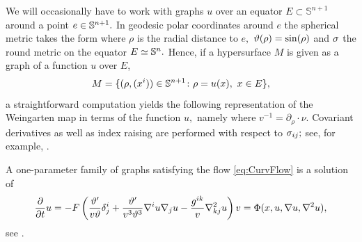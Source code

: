 \documentclass{amsart}
\begin{document}
We will occasionally have to work with graphs \(u\) over an equator $E \subset \mathbb{S}^{n+1}$ around a point $e\in\S^{n+1}.$ In geodesic polar coordinates around $e$ the spherical metric takes the form
where $\rho$ is the radial distance to $e,$ $\vt(\rho)=\sin(\rho)$ and $\s$ the round metric on the equator $E\simeq \S^n.$ Hence, if a hypersurface $M$ is given as a graph of a function $u$ over $E$,
\[M=\{(\rho,(x^i))\in \S^{n+1}\cn \rho=u(x),~ x\in E\},\]
a straightforward computation yields the following representation of the Weingarten map in terms of the function $u,$ namely
where $v^{-1} = \partial_\rho \cdot \nu.$ Covariant derivatives as well as index raising are performed with respect to $\s_{ij};$ see, for example, \cite[(3.82)]{Scheuer:05/2015}.

A one-parameter family of graphs satisfying the flow \eqref{eq:CurvFlow} is a solution of
\begin{equation}
\label{eq:GraphCurvFlow}
\fr{\del}{\del t}u=-F\br{\fr{\vt'}{v\vt}\d^{i}_{j}+\fr{\vt'}{v^{3}\vt^{3}}\nabla^{i}u\nabla_{j}u-\fr{g^{ik}}{v}\nabla^{2}_{kj}u}v=\Phi(x,u,\nabla u,\nabla^{2}u),
\end{equation}
see \cite[p.~98-99]{Gerhardt:/2006}.
\end{document}
